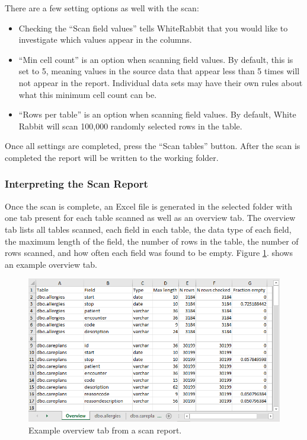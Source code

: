 \documentclass[11pt]{book}
\providecommand{\tightlist}{%
  \setlength{\itemsep}{0pt}\setlength{\parskip}{0pt}}
\theoremstyle{definition}
\theoremstyle{definition}
\theoremstyle{definition}
\theoremstyle{remark}
\begin{document}
There are a few setting options as well with the scan:

\begin{itemize}
\tightlist
\item
  Checking the ``Scan field values'' tells WhiteRabbit that you would like to investigate which values appear in the columns.
\item
  ``Min cell count'' is an option when scanning field values. By default, this is set to 5, meaning values in the source data that appear less than 5 times will not appear in the report. Individual data sets may have their own rules about what this minimum cell count can be.
\item
  ``Rows per table'' is an option when scanning field values. By default, White Rabbit will scan 100,000 randomly selected rows in the table.
\end{itemize}

Once all settings are completed, press the ``Scan tables'' button. After the scan is completed the report will be written to the working folder.

\hypertarget{interpreting-the-scan-report}{%
\subsubsection*{Interpreting the Scan Report}\label{interpreting-the-scan-report}}

Once the scan is complete, an Excel file is generated in the selected folder with one tab present for each table scanned as well as an overview tab. The overview tab lists all tables scanned, each field in each table, the data type of each field, the maximum length of the field, the number of rows in the table, the number of rows scanned, and how often each field was found to be empty. Figure \ref{fig:ScanOverviewTab}. shows an example overview tab.

\begin{figure}
\includegraphics[width=1\linewidth]{images/ExtractTransformLoad/ScanOverviewTab} \caption{Example overview tab from a scan report.}\label{fig:ScanOverviewTab}
\end{figure}
\end{document}
